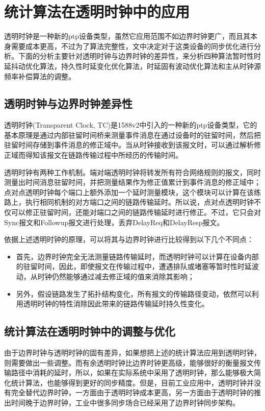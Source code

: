 \section{统计算法在透明时钟中的应用}
透明时钟是一种新的ptp设备类型，虽然它应用范围不如边界时钟更广，而且其本身需要成本更高，不过为了算法完整性，文中决定对于这类设备的同步优化进行分析。下面的分析主要针对透明时钟与边界时钟的差异性，来分析四种算法暂时性时延抖动优化算法，持久性时延变化优化算法，时延固有波动优化算法和主从时钟源频率补偿算法的调整。

\subsection{透明时钟与边界时钟差异性}
透明时钟(Transparent Clock, TC)是1588v2中引入的一种新的ptp设备类型，它的基本原理是通过内部驻留时间桥来测量事件消息在通过设备时的驻留时间，然后把驻留时间存储到事件消息的修正域中。当从时钟接收到该报文时，可以通过解析修正域而得知该报文在链路传输过程中所经历的传输时间。

透明时钟有两种工作机制。端对端透明时钟将转发所有符合网络规则的报文，同时测量出时间消息驻留时间，并把测量结果作为修正值累计到事件消息的修正域中；点对点透明时钟每个端口上额外添加一个延时测量模块，这个模块可以计算在该练路上，执行相同机制的对方端口之间的链路传输延时。所以说，点对点透明时钟不仅可以修正驻留时间，还能对端口之间的链路传输延时进行修正。不过，它只会对Sync报文和Followup报文进行处理，丢弃DelayReq和DelayResp报文。

依据上述透明时钟的原理，可以将其与边界时钟进行比较得到以下几个不同点：
\begin{itemize}[noitemsep,topsep=0pt,parsep=0pt,partopsep=0pt]
  \item 首先，边界时钟完全无法测量链路传输延时，而透明时钟可以计算在设备内部的驻留时间，因此，即使报文在传输过程中，遭遇排队或堵塞等暂时性时延波动，从时钟仍然能够通过减去修正域的值来消除其影响；
  \item 另外，假设链路发生了拓扑结构变化，所有报文的传输路径变动，依然可以利用透明时钟的特性消除因此带来的链路传输延时持久性变化。
\end{itemize}

\subsection{统计算法在透明时钟中的调整与优化}
由于边界时钟与透明时钟的固有差异，如果想把上述的统计算法应用到透明时钟，则需要做出一些调整。而有余透明时钟比边界时钟更高级，能够很好的衡量报文传输路径中消耗的延时，所以，如果在实际系统中采用了透明时钟，那么能够极大简化统计算法，也能够得到更好的同步精度。但是，目前工业应用中，透明时钟并没有完全替代边界时钟，一方面由于透明时钟成本更高，另一方面由于透明时钟的推出时间晚于边界时钟，工业中很多同步场合已经采用了边界时钟同步架构。

